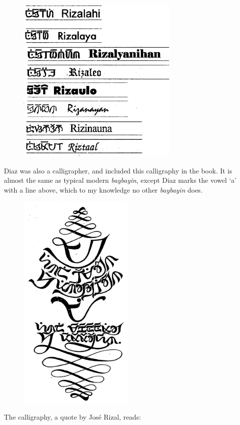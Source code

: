 \documentclass[a4paper,pagesize,openany,14pt,parskip=never]{scrbook}
\newcommand{\≈}{$\approx$}
\begin{document}
\begin{figure}[H]
\includegraphics[width=0.7\textwidth]{Rizal-fontsF}
\end{figure}
\newpage
Diaz was also a calligrapher, and included this calligraphy in the book. It is almost the same as typical modern {\em baybayin}, except Diaz marks the vowel `a' with a line above, which to my knowledge no other {\em baybayin} does.

\begin{figure}[H]
\includegraphics[width=0.5\textwidth]{ARCalligraphy}
\end{figure}
The calligraphy, a quote by Jos\'e Rizal, reads:
\end{document}

